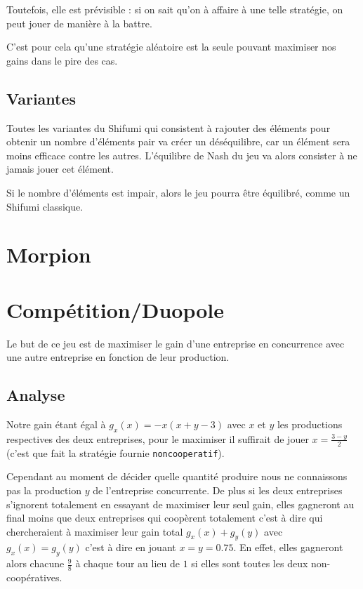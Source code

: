 \documentclass{scrartcl}
\begin{document}
    Toutefois, elle est prévisible : si on sait qu'on à affaire à une telle
    stratégie, on peut jouer de manière à la battre.

    C'est pour cela qu'une stratégie aléatoire est la seule pouvant maximiser
    nos gains dans le pire des cas.

    \subsection{Variantes}

    Toutes les variantes du Shifumi qui consistent à rajouter des éléments pour
    obtenir un nombre d'éléments pair va créer un déséquilibre, car un élément
    sera moins efficace contre les autres. L'équilibre de Nash du jeu va alors
    consister à ne jamais jouer cet élément.

    Si le nombre d'éléments est impair, alors le jeu pourra être équilibré,
    comme un Shifumi classique.

\section{Morpion}
\section{Compétition/Duopole}
  Le but de ce jeu est de maximiser le gain d'une entreprise en concurrence
  avec une autre entreprise en fonction de leur production.

  \subsection{Analyse}
    Notre gain étant égal à $g_x(x) = -x(x+y-3)$ avec $x$ et $y$ les
    productions respectives des deux entreprises, pour le maximiser il
    suffirait de jouer $x=\frac{3-y}{2}$ (c'est que fait la stratégie fournie
    \verb+noncooperatif+).
    
    Cependant au moment de décider quelle quantité produire nous ne connaissons
    pas la production $y$ de l'entreprise concurrente. De plus si les deux
    entreprises s'ignorent totalement en essayant de maximiser leur seul gain,
    elles gagneront au final moins que deux entreprises qui coopèrent
    totalement c'est à dire qui chercheraient à maximiser leur gain total
    $g_x(x)+g_y(y)$ avec $g_x(x) = g_y(y)$ c'est à dire en jouant $x=y=0.75$.
    En effet, elles gagneront alors chacune $\frac 9 8$ à chaque tour au lieu
    de $1$ si elles sont toutes les deux non-coopératives.
\end{document}
